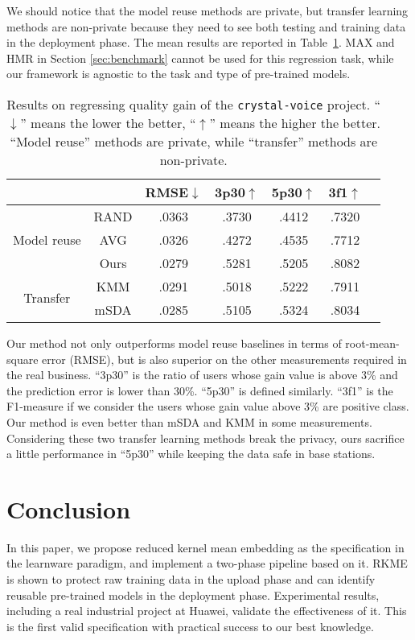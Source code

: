 \documentclass[paper=letter, fontsize=20pt]{article}
\newcommand{\bftab}{\fontseries{b}\selectfont}
\begin{document}
We should notice that the model reuse methods are private, but transfer learning methods are non-private because they need to see both testing and training data in the deployment phase. The mean results are reported in Table~\ref{table:crystal}. MAX and HMR in Section \ref{sec:benchmark} cannot be used for this regression task, while our framework is agnostic to the task and type of pre-trained models.

\begin{table}[htb]
\caption{Results on regressing quality gain of  the \texttt{crystal-voice} project. ``$\downarrow$'' means the lower the better, ``$\uparrow$'' means the higher the better. ``Model reuse'' methods are private, while ``transfer'' methods are non-private.} \label{table:crystal} 
\vspace{-0.2cm}
\setlength{\tabcolsep}{7.5pt}
\centering
\begin{tabular}{c c c c c c c} \toprule
  & & RMSE$\downarrow$ & 3p30$\uparrow$ & 5p30$\uparrow$ & 3f1$\uparrow$ \\
\midrule
 \multirow{3}{*}{Model reuse} 
 & RAND  & .0363 & .3730  & .4412 & .7320 \\
 & AVG   & .0326 & .4272  & .4535 & .7712 \\
 & Ours  & \bftab .0279 & \bftab .5281 & .5205 & \bftab .8082 \\
 \midrule\midrule
 \multirow{2}{*}{Transfer} 
 & KMM   & .0291 & .5018  & .5222 & .7911 \\
 & mSDA  & .0285 & .5105  & \bftab .5324 & .8034 \\
\bottomrule
\end{tabular}
\end{table}
Our method not only outperforms model reuse baselines in terms of root-mean-square error (RMSE), but is also superior on the other measurements required in the real business. ``3p30'' is the ratio of users whose gain value is above 3\% and the prediction error is lower than 30\%. ``5p30'' is defined similarly. ``3f1'' is the F1-measure if we consider the users whose gain value above 3\% are positive class. Our method is even better than mSDA and KMM in some measurements. Considering these two transfer learning methods break the privacy, ours sacrifice a little performance in ``5p30'' while keeping the data safe in base stations.

\section{Conclusion} 
In this paper, we propose reduced kernel mean embedding as the specification in the learnware paradigm, and implement a two-phase pipeline based on it. RKME is shown to protect raw training data in the upload phase and can identify reusable pre-trained models in the deployment phase. Experimental results, including a real industrial project at Huawei, validate the effectiveness of it. This is the first valid specification with practical success to our best knowledge.
\end{document}
